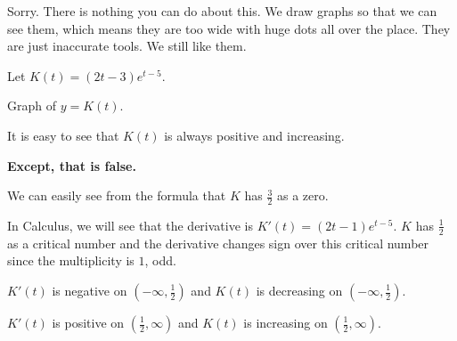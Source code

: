 \documentclass{ximera}
\begin{document}
Sorry.  There is nothing you can do about this. We draw graphs so that we can see them, which means they are too wide with huge dots all over the place. They are just inaccurate tools.  We still like them.





\begin{example}


Let $K(t) = (2t-3)e^{t-5}$.


Graph of $y = K(t)$.



\begin{image}
\end{image}



It is easy to see that $K(t)$ is always positive and increasing. 

\textbf{\textcolor{red!70!black}{Except, that is false.}} 

We can easily see from the formula that $K$ has $\frac{3}{2}$ as a zero.


In Calculus, we will see that the derivative is $K'(t) = (2t-1)e^{t-5}$.   $K$ has $\frac{1}{2}$ as a critical number and the derivative changes sign over this critical number since the multiplicity is $1$, odd.

$K'(t)$ is negative on $\left( -\infty, \frac{1}{2} \right)$ and $K(t)$ is decreasing on $\left( -\infty, \frac{1}{2} \right)$.

$K'(t)$ is positive on $\left(\frac{1}{2}, \infty \right)$ and $K(t)$ is increasing on $\left(\frac{1}{2}, \infty \right)$.



\end{example}
\end{document}

